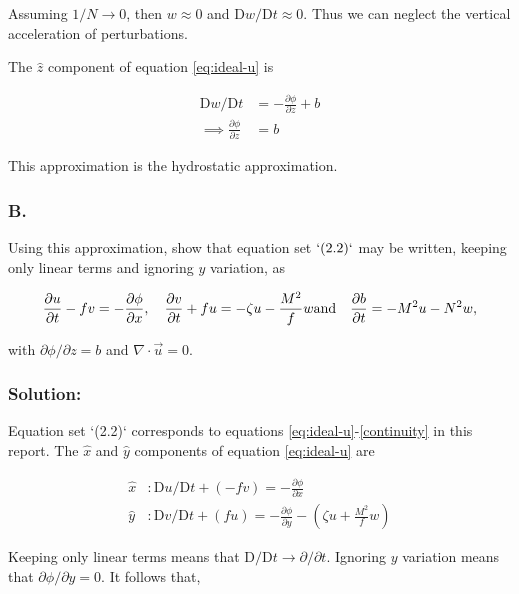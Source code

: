 \documentclass[12 pt]{article}
\numberwithin{equation}{section} %
\begin{document}
Assuming $1/N \rightarrow 0$, then $w \approx 0$ and $\text{D}w/\text{D}t \approx 0$. Thus we can neglect the vertical acceleration of perturbations.

The $\hat{z}$ component of equation \ref{eq:ideal-u} is

\begin{align*}
  \text{D}w/\text{D}t &= -\frac{\partial \phi}{\partial z} + b \\
  \implies \frac{\partial \phi}{\partial z} &= b
\end{align*}

This approximation is the hydrostatic approximation. \\


\subsubsection*{B.} Using this approximation, show that equation set $`(2.2)`$ may be written, keeping only linear terms and ignoring $y$ variation, as

\begin{equation}
\frac{\partial u}{\partial t} - fv = -\frac{\partial \phi}{\partial x}, \quad \frac{\partial v}{\partial t} + fu = -\zeta u-\frac{M^2}{f}w \\
\text{and} \quad \frac{\partial b}{\partial t}= -M^2 u-N^2w,
\end{equation}

with ${\partial \phi}/{\partial z} = b$ and $\nabla \cdot \vec u = 0$. \\

\subsubsection*{Solution:}
Equation set `(2.2)` corresponds to equations \ref{eq:ideal-u}-\ref{continuity} in this report. The $\hat{x}$ and $\hat{y}$ components of equation \ref{eq:ideal-u} are

\begin{align*}
  \hat{x}&: \text{D}u/\text{D}t + (-fv) = -\frac{\partial \phi}{\partial x} \\
  \hat{y}&: \text{D}v/\text{D}t + (fu) = -\frac{\partial \phi}{\partial y} - \left( \zeta u + \frac{M^2}{f} w \right)
\end{align*}

Keeping only linear terms means that $\text{D}/\text{D}t \rightarrow \partial/\partial t$. Ignoring $y$ variation means that $\partial \phi/\partial y = 0$. It follows that, 
\end{document}
